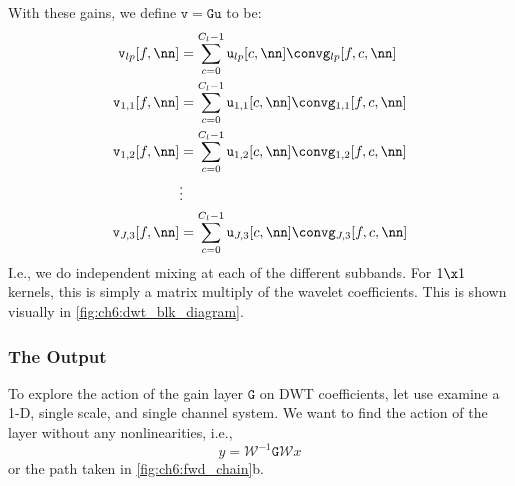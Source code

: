 With these gains, we define $\mathtt{v}=\mathtt{Gu}$ to be:
\begin{align}
  \mathtt{v}_{lp}[f, \nn] &=  \sum_{c=0}^{C_l-1} \mathtt{u}_{lp}[c, \nn] \conv \mathtt{g}_{lp}[f, c, \nn] \\
  \mathtt{v}_{1,1}[f, \nn] &=  \sum_{c=0}^{C_l-1} \mathtt{u}_{1,1}[c, \nn] \conv \mathtt{g}_{1,1}[f, c, \nn] \\
  \mathtt{v}_{1,2}[f, \nn] &=  \sum_{c=0}^{C_l-1} \mathtt{u}_{1,2}[c, \nn] \conv \mathtt{g}_{1,2}[f, c, \nn] \\
                  & \vdots  \nonumber \\
  \mathtt{v}_{J,3}[f, \nn] &=  \sum_{c=0}^{C_l-1} \mathtt{u}_{J,3}[c, \nn] \conv \mathtt{g}_{J,3}[f, c, \nn] 
\end{align}
%
I.e., we do independent mixing at each of the different subbands. For $1\x 1$
kernels, this is simply a matrix multiply of the wavelet coefficients. This is shown
visually in \autoref{fig:ch6:dwt_blk_diagram}.

\subsubsection{The Output}

\begin{figure}[ht!]
  \centering
  
  \label{fig:ch6:dwt_gain}
\end{figure}

To explore the action of the gain layer $\mathtt{G}$ on DWT coefficients, let
use examine a 1-D, single scale, and single channel system. We want to find the
action of the layer without any nonlinearities, i.e., 
\begin{equation}
y = \mathcal{W}^{-1}\mathtt{G}\mathcal{W}x
\end{equation}
or the path taken in \autoref{fig:ch6:fwd_chain}b. 

